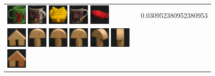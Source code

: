 \begin{figure}[tbp]
\begin{center}
\begin{tabular}{m{11cm} | m{3cm} |}
\includegraphics[width=1cm]{coil/beeld-31.eps}
\includegraphics[width=1cm]{coil/beeld-64.eps}
\includegraphics[width=1cm]{coil/beeld-14.eps}
\includegraphics[width=1cm]{coil/beeld-60.eps}
\includegraphics[width=1cm]{coil/beeld-22.eps}
& {\scriptsize 0.030952380952380953}
\\
\includegraphics[width=1cm]{coil/beeld-42.eps}
\includegraphics[width=1cm]{coil/beeld-0.eps}
\includegraphics[width=1cm]{coil/beeld-1.eps}
\includegraphics[width=1cm]{coil/beeld-0.eps}
\includegraphics[width=1cm]{coil/beeld-4.eps}
\includegraphics[width=1cm]{coil/beeld-2.eps}
\includegraphics[width=1cm]{coil/beeld-43.eps}

\end{tabular}
\end{center}
\end{figure}
